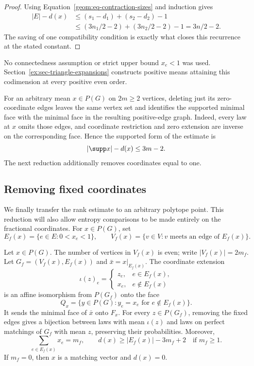 \begin{proof}
Using Equation~\eqref{geom:eq-contraction-sizes} and induction gives
\begin{align*}
 |E|-d(x)
 &\le (s_1-d_1)+(s_2-d_2)-1\\
 &\le (3n_1/2-2)+(3n_2/2-2)-1
   =3n/2-2.
\end{align*}
The saving of one compatibility condition is exactly what closes
this recurrence at the stated constant.
\end{proof}

No connectedness assumption or strict upper bound $x_e<1$ was used.
Section~\ref{ex:sec-triangle-expansions} constructs positive means
attaining this codimension at every positive even order.

For an arbitrary mean $x\in P(G)$ on $2m\ge2$ vertices, deleting just
its zero-coordinate edges leaves the same vertex set and identifies the supported minimal face
with the minimal face in the resulting positive-edge graph. Indeed,
every law at $x$ omits those edges, and coordinate restriction and zero
extension are inverse on the corresponding face. Hence the supported
form of the estimate is
\begin{equation}\label{geom:eq-supported-rank}
                |\supp x|-d(x)\le3m-2.
\end{equation}
The next reduction additionally removes coordinates equal to one.

\subsection{Removing fixed coordinates}

We finally transfer the rank estimate to an arbitrary polytope
point. This reduction will also allow entropy comparisons to be
made entirely on the fractional coordinates.
For \(x\in P(G)\), set
\[
 E_f(x)=\{e\in E:0<x_e<1\},\qquad
 V_f(x)=\{v\in V:v\text{ meets an edge of }E_f(x)\}.
\]

\begin{lemma}
\label{geom:lem-reduction}
Let \(x\in P(G)\). The number of vertices in \(V_f(x)\) is even;
write \(|V_f(x)|=2m_f\). Let
\(G_f=(V_f(x),E_f(x))\) and \(\bar x=x|_{E_f(x)}\).
The coordinate extension
\begin{equation}
\label{geom:eq-extension}
 \iota(z)_e=
 \begin{cases}
 z_e,&e\in E_f(x),\\
 x_e,&e\notin E_f(x)
 \end{cases}
\end{equation}
is an affine isomorphism from \(P(G_f)\) onto the face
\[
 Q_x=\{y\in P(G):y_e=x_e\text{ for }e\notin E_f(x)\}.
\]
It sends the minimal face of \(\bar x\) onto \(F_x\). For every
\(z\in P(G_f)\), removing the fixed edges gives a bijection between
laws with mean \(\iota(z)\) and laws on perfect matchings of \(G_f\)
with mean \(z\), preserving their probabilities. Moreover,
\begin{equation}
\label{geom:eq-fractional-rank}
 \sum_{e\in E_f(x)}x_e=m_f,\qquad
 d(x)\ge |E_f(x)|-3m_f+2\quad\text{if }m_f\ge1.
\end{equation}
If \(m_f=0\), then \(x\) is a matching vector and \(d(x)=0\).
\end{lemma}

